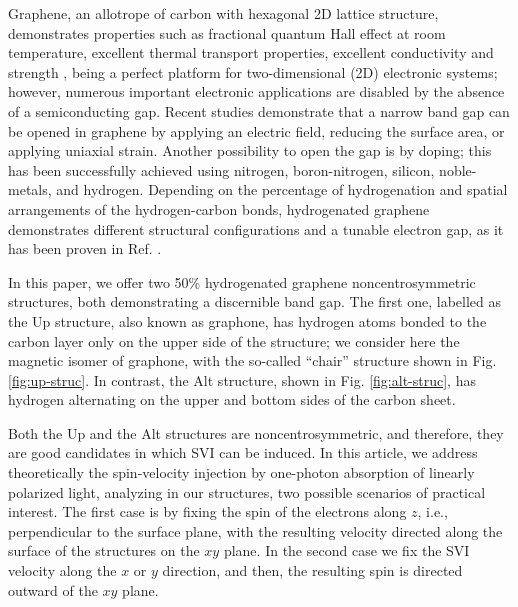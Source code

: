 \documentclass[floatfix,prb,aps,superscriptaddress,showpacs,11pt,preprint,letterpaper]{revtex4}
\begin{document}
Graphene, an allotrope of carbon with hexagonal 2D lattice structure,
demonstrates properties such as fractional quantum Hall effect at room
temperature, excellent thermal transport properties, excellent
conductivity\cite{heerscheNat07} and strength \cite{geimNM07, reinaNL08,
novoselov2S07, balandinNL08}, being a perfect platform  for two-dimensional (2D)
electronic systems; however, numerous important electronic applications are disabled by the
absence of a semiconducting gap. Recent studies demonstrate that a narrow band
gap  can be opened in graphene by applying an electric field,\cite{zhangN09}
reducing the surface area,\cite{hanPRL07} or applying uniaxial
strain.\cite{niACSN08} Another possibility to open the gap is by doping; this
has been successfully achieved using nitrogen,\cite{weiNL2009} 
boron-nitrogen,\cite{guoIJ11} silicon,\cite{colettiPRB10} 
noble-metals,\cite{varykhalovPRB10} and hydrogen.\cite{eliasS09, guisingerNL09,
samarakoonACSN10} Depending on the percentage of hydrogenation and spatial
arrangements of the hydrogen-carbon bonds, hydrogenated graphene demonstrates
different structural configurations and a tunable electron gap, as it has been
proven in Ref. . 

In this paper, we offer two 50\% hydrogenated graphene
noncentrosymmetric structures, both demonstrating a discernible band gap. The
first one, labelled as the Up structure, also known as
graphone,\cite{gmitraPRL13}  has
hydrogen atoms bonded to the carbon layer only on the upper side of the
structure; we consider here the magnetic isomer of graphone, with the so-called
``chair'' structure  shown in Fig. \ref{fig:up-struc}.
In contrast,  the Alt structure, shown in Fig. 
\ref{fig:alt-struc}, has hydrogen alternating on the upper and bottom sides of 
the carbon sheet.\cite{zapataPSB2016}

Both the Up and the Alt  structures
are noncentrosymmetric, and therefore,
they are good candidates in which SVI can be
induced. In this article, 
we address theoretically the spin-velocity injection
by one-photon absorption of linearly polarized light, analyzing
in our structures,
two possible scenarios of practical interest. 
The first case is by fixing the spin of the electrons along $z$, i.e.,
perpendicular 
to the surface plane, with the resulting velocity
directed along the surface of the
structures on the $xy$ plane. 
In the second case we fix the SVI velocity along the
$x$ or $y$ direction, and then, the resulting spin is directed outward of the
$xy$ plane. 
\end{document}
